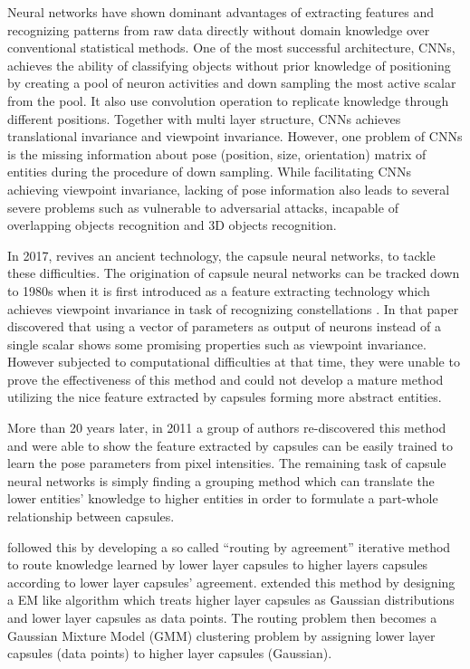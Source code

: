 \documentclass{article} \usepackage{tabularx}
\renewcommand{\citename}{\citet} \renewcommand{\cite}{\citep}
\begin{document}
Neural networks have shown dominant advantages of extracting
features and recognizing patterns from raw data directly without
domain knowledge over conventional statistical methods. One of
the most successful architecture, CNNs, achieves the ability of
classifying objects without prior knowledge of positioning by
creating a pool of neuron activities and down sampling the most
active scalar from the pool. It also use convolution operation to
replicate knowledge through different positions. Together with
multi layer structure, CNNs achieves translational invariance and
viewpoint invariance. However, one problem of CNNs is the missing
information about pose (position, size, orientation) matrix of
entities during the procedure of down sampling. While
facilitating CNNs achieving viewpoint invariance, lacking of pose
information also leads to several severe problems such as
vulnerable to adversarial attacks, incapable of overlapping
objects recognition and 3D objects recognition.

In 2017, \citeauthor*{capsule}\cite{capsule} revives an ancient
technology, the capsule neural networks, to tackle these
difficulties. The origination of capsule neural networks can be
tracked down to 1980s when it is first introduced as a feature
extracting technology which achieves viewpoint invariance in task
of recognizing constellations \cite{zemel1990traffic}. In that
paper \citeauthor*{zemel1990traffic} \cite{zemel1990traffic}
discovered that using a vector of parameters as output of neurons
instead of a single scalar shows some promising properties such
as viewpoint invariance. However subjected to computational
difficulties at that time, they were unable to prove the
effectiveness of this method and could not develop a mature
method utilizing the nice feature extracted by capsules forming
more abstract entities.

More than 20 years later, in 2011 a group of authors
\citeauthor*{hinton2011transforming}
\cite{hinton2011transforming} re-discovered this method and were
able to show the feature extracted by capsules can be easily
trained to learn the pose parameters from pixel intensities. The
remaining task of capsule neural networks is simply finding a
grouping method which can translate the lower entities' knowledge
to higher entities in order to formulate a part-whole
relationship between capsules.

\citename{capsule} followed this by developing a so called
``routing by agreement'' iterative method to route knowledge
learned by lower layer capsules to higher layers capsules
according to lower layer capsules' agreement.
\citename{hinton2018matrix} extended this method by designing a
EM like algorithm which treats higher layer capsules as Gaussian
distributions and lower layer capsules as data points. The
routing problem then becomes a Gaussian Mixture Model (GMM)
clustering problem by assigning lower layer capsules (data
points) to higher layer capsules (Gaussian).
\end{document}
